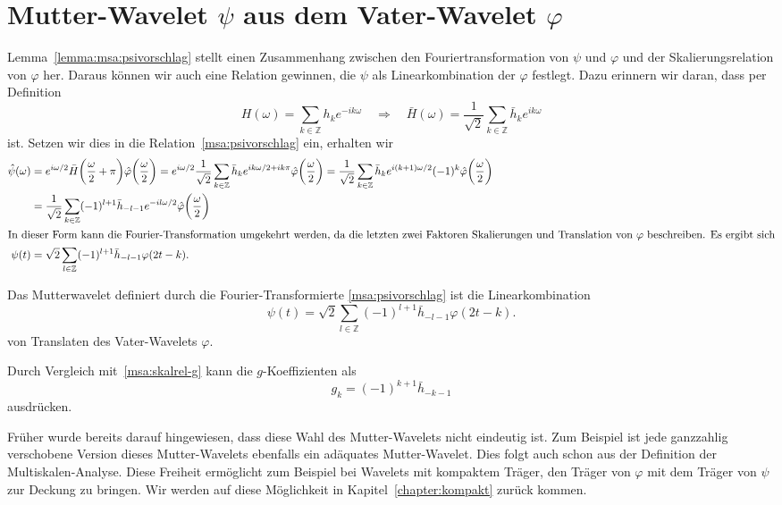 \section{Mutter-Wavelet $\psi$ aus dem Vater-Wavelet $\varphi$
\label{section:mutter-aus-vater}}
Lemma~\ref{lemma:msa:psivorschlag} stellt einen Zusammenhang zwischen
den Fouriertransformation von $\psi$ und $\varphi$ und der Skalierungsrelation
von $\varphi$ her.
Daraus können wir auch eine Relation gewinnen, die $\psi$ als
Linearkombination der $\varphi$ festlegt.
Dazu erinnern wir daran, dass per Definition
\[
H(\omega) = \sum_{k\in\mathbb Z} h_k e^{-ik\omega} 
\quad\Rightarrow\quad
\bar{H}(\omega)
=
\frac{1}{\sqrt{2}}
\sum_{k\in\mathbb Z} \bar{h}_k e^{ik\omega} 
\]
ist.
Setzen wir dies in die Relation~\eqref{msa:psivorschlag} ein, erhalten wir
\begin{align*}
\hat{\psi}(\omega)
&=
e^{i\omega/2}
\bar{H}\biggl(\frac{\omega}2+\pi\biggr)
\hat{\varphi}\biggl(\frac{\omega}2\biggr)
=
e^{i\omega/2}
\frac{1}{\sqrt{2}}
\sum_{k\in\mathbb Z} \bar{h}_k e^{ik\omega/2 + ik\pi} 
\hat{\varphi}\biggl(\frac{\omega}2\biggr)
=
\frac{1}{\sqrt{2}}
\sum_{k\in\mathbb Z} \bar{h}_k e^{i(k+1)\omega/2} (-1)^k
\hat{\varphi}\biggl(\frac{\omega}2\biggr)
\\
&=
\frac{1}{\sqrt{2}}
\sum_{k\in\mathbb Z}
(-1)^{l+1}
\bar{h}_{-l-1} e^{-il\omega/2}
\hat{\varphi}\biggl(\frac{\omega}2\biggr)
\\
\intertext{In dieser Form kann die Fourier-Transformation umgekehrt werden,
da die letzten zwei Faktoren Skalierungen und Translation von $\varphi$
beschreiben.
Es ergibt sich}
\psi(t)
&=
\sqrt{2}\sum_{l\in\mathbb Z} (-1)^{l+1}\bar{h}_{-l-1} \varphi(2t-k).
\end{align*}

\begin{lemma}
\label{lemma:msa:psirelation}
Das Mutterwavelet definiert durch die Fourier-Transformierte
\eqref{msa:psivorschlag}
ist die Linearkombination
\begin{equation}
\psi(t)
=
\sqrt{2}\sum_{l\in\mathbb Z} (-1)^{l+1}\bar{h}_{-l-1} \varphi(2t-k).
\end{equation}
von Translaten des Vater-Wavelets $\varphi$.
\end{lemma}

Durch Vergleich mit~\eqref{msa:skalrel-g} kann die $g$-Koeffizienten als
\[
g_k = (-1)^{k+1} \bar{h}_{-k-1}
\]
ausdrücken.

Früher wurde bereits darauf hingewiesen, dass diese Wahl des Mutter-Wavelets
nicht eindeutig ist.
Zum Beispiel ist jede ganzzahlig verschobene Version dieses Mutter-Wavelets
ebenfalls ein adäquates Mutter-Wavelet.
Dies folgt auch schon aus der Definition der Multiskalen-Analyse.
Diese Freiheit ermöglicht zum Beispiel bei Wavelets mit kompaktem Träger,
den Träger von $\varphi$ mit dem Träger von $\psi$ zur Deckung zu
bringen.
Wir werden auf diese Möglichkeit in Kapitel~\ref{chapter:kompakt}
zurück kommen.


